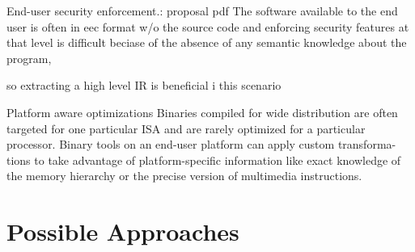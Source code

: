 \documentclass[mathserif,10pt]{beamer}
\begin{document}
{{  End-user security enforcement.: proposal pdf
  The software available to the end user is often in eec format w/o the source code
  and enforcing security features at that level is 
  difficult beciase of the absence of any semantic knowledge about the program,

  so extracting a high level IR is beneficial i this scenario

  Platform aware optimizations
    Binaries compiled for wide distribution are often targeted for one
    particular ISA and are rarely optimized for a particular processor.  Binary
    tools on an end-user platform can apply custom transforma- tions to take
    advantage of platform-specific information like exact knowledge of the
    memory hierarchy or the precise version of multimedia instructions.
  
  }
}

\section{Possible Approaches}
\end{document}
